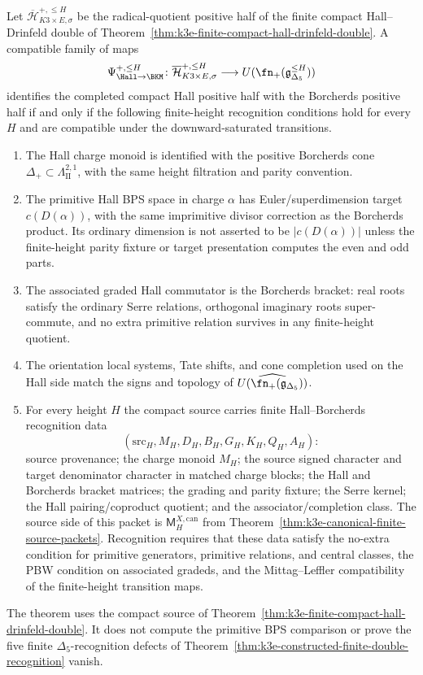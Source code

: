 \begin{theorem}
\label{thm:k3e-positive-half-hall-borcherds-criterion}
Let \(\overline{\mathcal H}^{+,\leq H}_{K3\times E,\sigma}\) be the
radical-quotient positive half of the finite compact Hall--Drinfeld
double of
Theorem~\ref{thm:k3e-finite-compact-hall-drinfeld-double}. A compatible
family of maps
\[
 \Psi^{+,\leq H}_{\Hall\to\BKM}\colon
 \overline{\mathcal H}^{+,\leq H}_{K3\times E,\sigma}
 \longrightarrow
 U(\fn_+(\mathfrak g_{\Delta_5}^{\leq H}))
\]
identifies the completed compact Hall positive half with the Borcherds
positive half if and only if the following finite-height recognition
conditions hold for every \(H\) and are compatible under the
downward-saturated transitions.
\begin{enumerate}[label=\textup{(\roman*)}]
\item The Hall charge monoid is identified with the positive
Borcherds cone \(\Delta_+\subset\Lambda_{\mathrm{II}}^{2,1}\), with
the same height filtration and parity convention.
\item The primitive Hall BPS space in charge \(\alpha\) has
Euler/superdimension target \(c(D(\alpha))\), with the same imprimitive
divisor correction as the Borcherds product. Its ordinary dimension is
not asserted to be \(|c(D(\alpha))|\) unless the finite-height parity
fixture or target presentation computes the even and odd parts.
\item The associated graded Hall commutator is the Borcherds bracket:
real roots satisfy the ordinary Serre relations, orthogonal imaginary
roots super-commute, and no extra primitive relation survives in any
finite-height quotient.
\item The orientation local systems, Tate shifts, and cone completion
used on the Hall side match the signs and topology of
\(\widehat{U(\fn_+(\mathfrak g_{\Delta_5}))}\).
\item For every height \(H\) the compact source carries finite
Hall--Borcherds recognition data
\[
(\mathrm{src}_H,M_H,D_H,B_H,G_H,K_H,Q_H,A_H):
\]
source provenance; the charge monoid \(M_H\); the source signed
character and target denominator character in matched charge blocks;
the Hall and Borcherds bracket matrices; the grading and parity
fixture; the Serre kernel; the Hall pairing/coproduct quotient; and the
associator/completion class. The source side of this packet is
\(\mathsf M_H^{X,\mathrm{can}}\) from
Theorem~\ref{thm:k3e-canonical-finite-source-packets}. Recognition
requires that these data satisfy the no-extra condition for primitive
generators, primitive relations, and central classes, the PBW condition
on associated gradeds, and the Mittag--Leffler compatibility of the
finite-height transition maps.
\end{enumerate}
The theorem uses the compact source of
Theorem~\ref{thm:k3e-finite-compact-hall-drinfeld-double}. It does not
compute the primitive BPS comparison or prove the five finite
\(\Delta_5\)-recognition defects of
Theorem~\ref{thm:k3e-constructed-finite-double-recognition} vanish.
\end{theorem}

